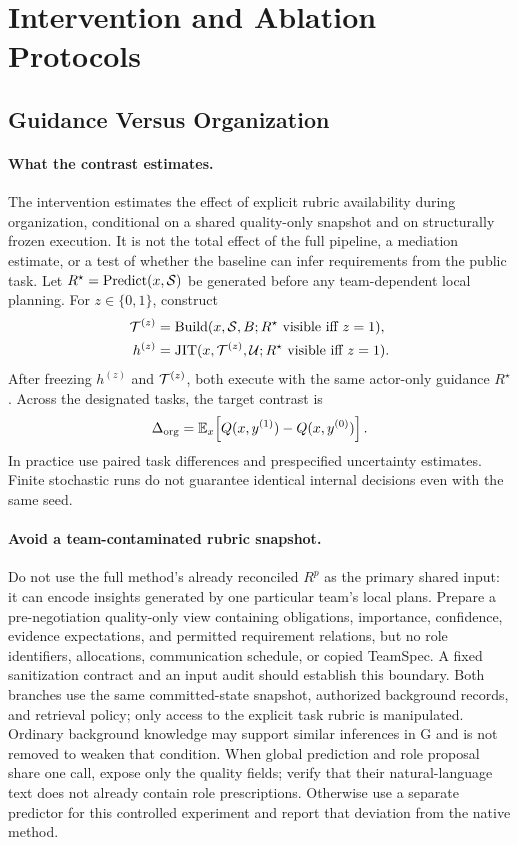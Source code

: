 \section{Intervention and Ablation Protocols}
\label{app:interventions}

\subsection{Guidance Versus Organization}
\label{app:ggo}

\paragraph{What the contrast estimates.}
The intervention estimates the effect of explicit rubric availability during organization, conditional on a shared quality-only snapshot and on structurally frozen execution. It is not the total effect of the full pipeline, a mediation estimate, or a test of whether the baseline can infer requirements from the public task. Let $R^{\star}=\operatorname{Predict}(x,\mathcal{S})$ be generated before any team-dependent local planning. For $z\in\{0,1\}$, construct
\begin{align}
\mathcal{T}^{(z)}&=\operatorname{Build}(x,\mathcal{S},B;R^{\star}\text{ visible iff }z=1),\nonumber\\
h^{(z)}&=\operatorname{JIT}(x,\mathcal{T}^{(z)},\mathcal U;R^{\star}\text{ visible iff }z=1).
\end{align}
After freezing $h^{(z)}$ and $\mathcal{T}^{(z)}$, both execute with the same actor-only guidance $R^{\star}$. Across the designated tasks, the target contrast is
\begin{equation}
\Delta_{\rm org}=\mathbb E_x\!\left[Q(x,y^{(1)})-Q(x,y^{(0)})\right].
\end{equation}
In practice use paired task differences and prespecified uncertainty estimates. Finite stochastic runs do not guarantee identical internal decisions even with the same seed.

\paragraph{Avoid a team-contaminated rubric snapshot.}
Do not use the full method's already reconciled $R^p$ as the primary shared input: it can encode insights generated by one particular team's local plans. Prepare a pre-negotiation quality-only view containing obligations, importance, confidence, evidence expectations, and permitted requirement relations, but no role identifiers, allocations, communication schedule, or copied TeamSpec. A fixed sanitization contract and an input audit should establish this boundary. Both branches use the same committed-state snapshot, authorized background records, and retrieval policy; only access to the explicit task rubric is manipulated. Ordinary background knowledge may support similar inferences in G and is not removed to weaken that condition. When global prediction and role proposal share one call, expose only the quality fields; verify that their natural-language text does not already contain role prescriptions. Otherwise use a separate predictor for this controlled experiment and report that deviation from the native method.

